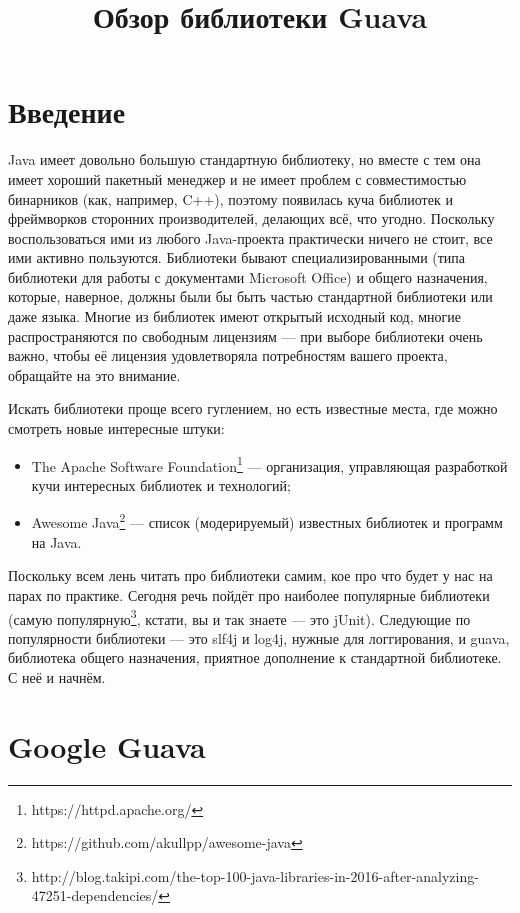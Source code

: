 \documentclass[a5paper,draft]{article}
\title{Обзор библиотеки Guava}
\date{}
\begin{document}
\maketitle
\thispagestyle{empty}

\section{Введение}

Java имеет довольно большую стандартную библиотеку, но вместе с тем она имеет хороший пакетный менеджер и не имеет проблем с совместимостью бинарников (как, например, C++), поэтому появилась куча библиотек и фреймворков сторонних производителей, делающих всё, что угодно. Поскольку воспользоваться ими из любого Java-проекта практически ничего не стоит, все ими активно пользуются. Библиотеки бывают специализированными (типа библиотеки для работы с документами Microsoft Office) и общего назначения, которые, наверное, должны были бы быть частью стандартной библиотеки или даже языка. Многие из библиотек имеют открытый исходный код, многие распространяются по свободным лицензиям --- при выборе библиотеки очень важно, чтобы её лицензия удовлетворяла потребностям вашего проекта, обращайте на это внимание.

Искать библиотеки проще всего гуглением, но есть известные места, где можно смотреть новые интересные штуки: 
\begin{itemize}
	\item The Apache Software Foundation\footnote{https://httpd.apache.org/} --- организация, управляющая разработкой кучи интересных библиотек и технологий;
	\item Awesome Java\footnote{https://github.com/akullpp/awesome-java} --- список (модерируемый) известных библиотек и программ на Java.
\end{itemize}

Поскольку всем лень читать про библиотеки самим, кое про что будет у нас на парах по практике. Сегодня речь пойдёт про наиболее популярные библиотеки (самую популярную\footnote{http://blog.takipi.com/the-top-100-java-libraries-in-2016-after-analyzing-47251-dependencies/}, кстати, вы и так знаете --- это jUnit). Следующие по популярности библиотеки --- это slf4j и log4j, нужные для логгирования, и guava, библиотека общего назначения, приятное дополнение к стандартной библиотеке. С неё и начнём.

\section{Google Guava}
\end{document}
